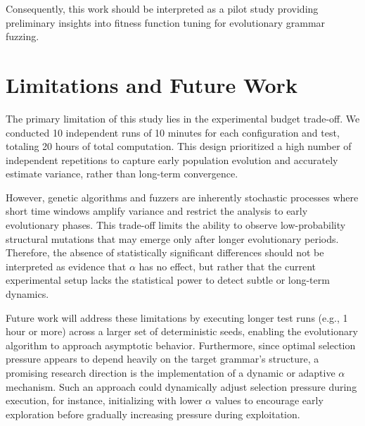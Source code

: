 \documentclass[conference]{IEEEtran}
\begin{document}
Consequently, this work should be interpreted as a pilot study providing preliminary insights into fitness function tuning for evolutionary grammar fuzzing.




\section{Limitations and Future Work}
The primary limitation of this study lies in the experimental budget trade-off. We conducted 10 independent runs of 10 minutes for each configuration and test, totaling 20 hours of total computation. This design prioritized a high number of independent repetitions to capture early population evolution and accurately estimate variance, rather than long-term convergence.

However, genetic algorithms and fuzzers are inherently stochastic processes where short time windows amplify variance and restrict the analysis to early evolutionary phases. This trade-off limits the ability to observe low-probability structural mutations that may emerge only after longer evolutionary periods. Therefore, the absence of statistically significant differences should not be interpreted as evidence that $\alpha$ has no effect, but rather that the current experimental setup lacks the statistical power to detect subtle or long-term dynamics.

Future work will address these limitations by executing longer test runs (e.g., 1 hour or more) across a larger set of deterministic seeds, enabling the evolutionary algorithm to approach asymptotic behavior. Furthermore, since optimal selection pressure appears to depend heavily on the target grammar's structure, a promising research direction is the implementation of a dynamic or adaptive $\alpha$ mechanism. Such an approach could dynamically adjust selection pressure during execution, for instance, initializing with lower $\alpha$ values to encourage early exploration before gradually increasing pressure during exploitation.






\FloatBarrier


\end{document}

